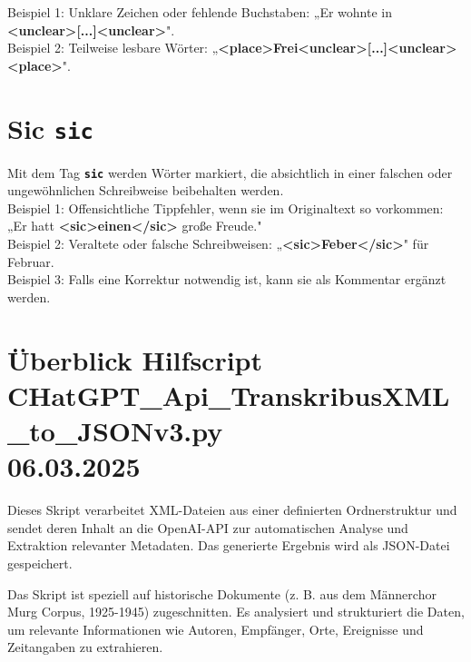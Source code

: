 \documentclass{article}
\begin{document}
\noindent{} Beispiel 1: Unklare Zeichen oder fehlende Buchstaben: „Er wohnte in \textbf{\textless unclear\textgreater [...]\textless unclear\textgreater }".\\
 Beispiel 2: Teilweise lesbare Wörter: „\textbf{\textless place\textgreater Frei\textless unclear\textgreater [...]\textless unclear\textgreater \textless place\textgreater }".\\


\section*{Sic \texttt{\textbf{{\colorbox{sic}{sic}}}}}


Mit dem Tag \texttt{\texttt{\textbf{{\colorbox{sic}{sic}}}}} werden Wörter markiert, die absichtlich in einer falschen oder ungewöhnlichen Schreibweise beibehalten werden. \\

\noindent{} Beispiel 1: Offensichtliche Tippfehler, wenn sie im Originaltext so vorkommen: „Er hatt \textbf{\textless sic\textgreater einen\textless /sic\textgreater } große Freude."\\
 Beispiel 2: Veraltete oder falsche Schreibweisen: „\textbf{\textless sic\textgreater Feber\textless /sic\textgreater }" für Februar.\\
 Beispiel 3: Falls eine Korrektur notwendig ist, kann sie als Kommentar ergänzt werden. \\


\newpage %


\section{Überblick Hilfscript\\CHatGPT\_Api\_TranskribusXML\_to\_JSONv3.py \\\small 06.03.2025}
Dieses Skript verarbeitet XML-Dateien aus einer definierten Ordnerstruktur und sendet deren Inhalt an die OpenAI-API zur automatischen Analyse und Extraktion relevanter Metadaten. Das generierte Ergebnis wird als JSON-Datei gespeichert.

Das Skript ist speziell auf historische Dokumente (z. B. aus dem Männerchor Murg Corpus, 1925-1945) zugeschnitten. Es analysiert und strukturiert die Daten, um relevante Informationen wie Autoren, Empfänger, Orte, Ereignisse und Zeitangaben zu extrahieren.
\end{document}
